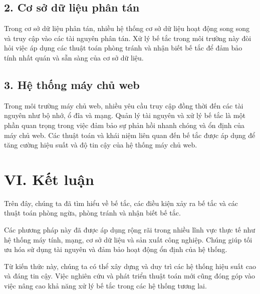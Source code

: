 \documentclass[12pt]{report}
\begin{document}
\subsection*{2. Cơ sở dữ liệu phân tán}
Trong cơ sở dữ liệu phân tán, nhiều hệ thống cơ sở dữ liệu hoạt động song song và truy cập vào các tài nguyên phân tán. Xử lý bế tắc trong môi trường này đòi hỏi việc áp dụng các thuật toán phòng tránh và nhận biết bế tắc để đảm bảo tính nhất quán và sẵn sàng của cơ sở dữ liệu.

\subsection*{3. Hệ thống máy chủ web}
Trong môi trường máy chủ web, nhiều yêu cầu truy cập đồng thời đến các tài nguyên như bộ nhớ, ổ đĩa và mạng. Quản lý tài nguyên và xử lý bế tắc là một phần quan trọng trong việc đảm bảo sự phản hồi nhanh chóng và ổn định của máy chủ web. Các thuật toán và khái niệm liên quan đến bế tắc được áp dụng để tăng cường hiệu suất và độ tin cậy của hệ thống máy chủ web.
\section*{VI. Kết luận}

Trên đây, chúng ta đã tìm hiểu về bế tắc, các điều kiện xảy ra bế tắc và các thuật toán phòng ngừa, phòng tránh và nhận biết bế tắc.\vspace{2mm}

Các phương pháp này đã được áp dụng rộng rãi trong nhiều lĩnh vực thực tế như hệ thống máy tính, mạng, cơ sở dữ liệu và sản xuất công nghiệp. Chúng giúp tối ưu hóa sử dụng tài nguyên và đảm bảo hoạt động ổn định của hệ thống.\vspace{2mm}

Từ kiến thức này, chúng ta có thể xây dựng và duy trì các hệ thống hiệu suất cao và đáng tin cậy. Việc nghiên cứu và phát triển thuật toán mới cũng đóng góp vào việc nâng cao khả năng xử lý bế tắc trong các hệ thống tương lai.
\end{document}
